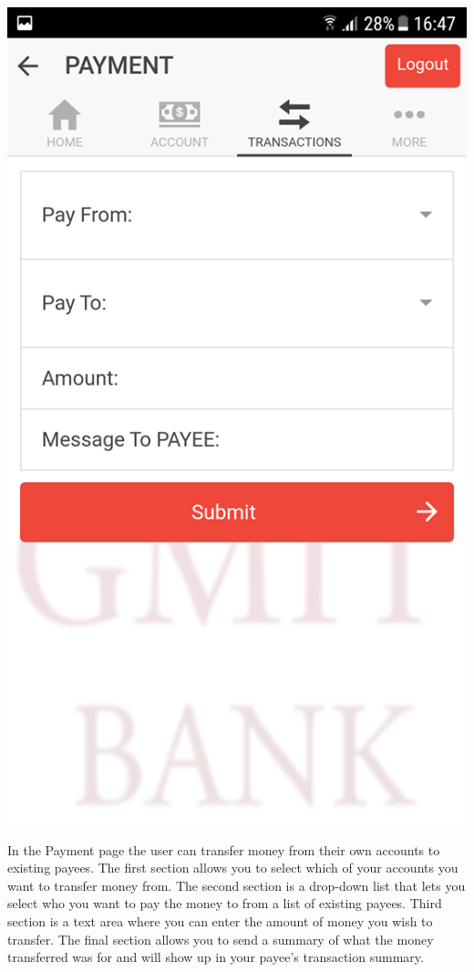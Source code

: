 \begin{center}
    \includegraphics[scale=0.5]{img/11transferempty.png}
\end{center}
In the Payment page the user can transfer money from their own accounts to existing payees. The first section allows you to select which of your accounts you want to transfer money from. The second section is a drop-down list that lets you select who you want to pay the money to from a list of existing payees. Third section is a text area where you can enter the amount of money you wish to transfer. The final section allows you to send a summary of what the money transferred was for and will show up in your payee’s transaction summary. \paragraph{}
